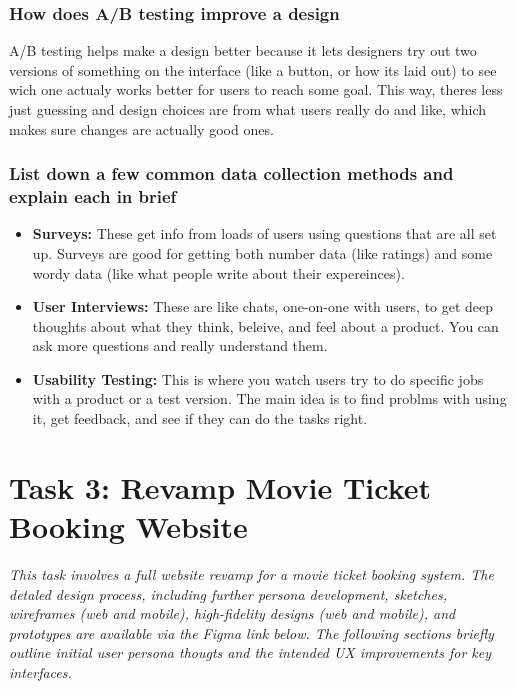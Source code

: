 \documentclass[12pt,a4paper]{article}
\begin{document}
\subsubsection*{How does A/B testing improve a design}
A/B testing helps make a design better because it lets designers try out two versions of something on the interface (like a button, or how its laid out) to see wich one actualy works better for users to reach some goal. This way, theres less just guessing and design choices are from what users really do and like, which makes sure changes are actually good ones.

\subsubsection*{List down a few common data collection methods and explain each in brief}
\begin{itemize}
    \item \textbf{Surveys:} These get info from loads of users using questions that are all set up. Surveys are good for getting both number data (like ratings) and some wordy data (like what people write about their expereinces).
    \item \textbf{User Interviews:} These are like chats, one-on-one with users, to get deep thoughts about what they think, beleive, and feel about a product. You can ask more questions and really understand them.
    \item \textbf{Usability Testing:} This is where you watch users try to do specific jobs with a product or a test version. The main idea is to find problms with using it, get feedback, and see if they can do the tasks right.
\end{itemize}

\vspace{1cm}

\section*{Task 3: Revamp Movie Ticket Booking Website}
\textit{This task involves a full website revamp for a movie ticket booking system. The detaled design process, including further persona development, sketches, wireframes (web and mobile), high-fidelity designs (web and mobile), and prototypes are available via the Figma link below. The following sections briefly outline initial user persona thougts and the intended UX improvements for key interfaces.}
\end{document}
